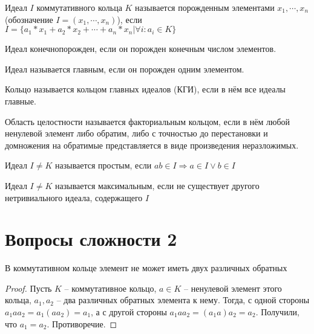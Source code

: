 \documentclass{article}
\begin{document}
\begin{definition}
    Идеал $I$ коммутативного кольца $K$ называется порожденным элементами $x_1, \cdots, x_n$ (обозначение $I = (x_1,
    \cdots, x_n)$), если $I = \{a_1 * x_1 + a_2 * x_2 + \cdots + a_n * x_n | \forall i: a_i \in K\}$
\end{definition}

\begin{definition}
    Идеал конечнопорожден, если он порожден конечным числом элементов.
\end{definition}

\begin{definition}
    Идеал называется главным, если он порожден одним элементом.
\end{definition}

\begin{definition}
    Кольцо называется кольцом главных идеалов (КГИ), если в нём все идеалы главные.
\end{definition}

\begin{definition}
    Область целостности называется факториальным кольцом, если в нём любой ненулевой элемент либо обратим, либо с
    точностью до перестановки и домножения на обратимые представляется в виде произведения неразложимых.
\end{definition}

\begin{definition}
    Идеал $I \neq K$ называется простым, если $ab \in I \Rightarrow a \in I \vee b \in I$
\end{definition}

\begin{definition}
    Идеал $I \neq K$ называется максимальным, если не существует другого нетривиального идеала, содержащего $I$
\end{definition}

\section{Вопросы сложности 2}

\begin{statement}
    В коммутативном кольце элемент не может иметь двух различных обратных
\end{statement}

\begin{proof}
    Пусть $K$ -- коммутативное кольцо, $a \in K$ -- ненулевой элемент этого кольца, $a_1, a_2$ -- два различных обратных
    элемента к нему.
    Тогда, с одной стороны $a_1 a a_2 = a_1 (a a_2) = a_1$, а с другой стороны $a_1 a a_2 = (a_1 a) a_2 = a_2$.
    Получили, что $a_1 = a_2$. Противоречие.
\end{proof}
\end{document}
